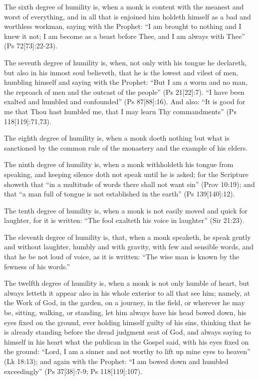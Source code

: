 The sixth degree of humility is, when a monk is content with the meanest and worst of everything, and in all that is enjoined him holdeth himself as a bad and worthless workman, saying with the Prophet: ``I am brought to nothing and I knew it not; I am become as a beast before Thee, and I am always with Thee'' (Ps 72[73]:22-23).

The seventh degree of humility is, when, not only with his tongue he declareth, but also in his inmost soul believeth, that he is the lowest and vilest of men, humbling himself and saying with the Prophet: ``But I am a worm and no man, the reproach of men and the outcast of the people'' (Ps 21[22]:7). ``I have been exalted and humbled and confounded'' (Ps 87[88]:16). And also: ``It is good for me that Thou hast humbled me, that I may learn Thy commandments'' (Ps 118[119]:71,73).

The eighth degree of humility is, when a monk doeth nothing but what is sanctioned by the common rule of the monastery and the example of his elders.

The ninth degree of humility is, when a monk withholdeth his tongue from speaking, and keeping silence doth not speak until he is asked; for the Scripture showeth that ``in a multitude of words there shall not want sin'' (Prov 10:19); and that ``a man full of tongue is not established in the earth'' (Ps 139[140]:12).

The tenth degree of humility is, when a monk is not easily moved and quick for laughter, for it is written: ``The fool exalteth his voice in laughter'' (Sir 21:23).

The eleventh degree of humility is, that, when a monk speaketh, he speak gently and without laughter, humbly and with gravity, with few and sensible words, and that he be not loud of voice, as it is written: ``The wise man is known by the fewness of his words.''

The twelfth degree of humility is, when a monk is not only humble of heart, but always letteth it appear also in his whole exterior to all that see him; namely, at the Work of God, in the garden, on a journey, in the field, or wherever he may be, sitting, walking, or standing, let him always have his head bowed down, his eyes fixed on the ground, ever holding himself guilty of his sins, thinking that he is already standing before the dread judgment seat of God, and always saying to himself in his heart what the publican in the Gospel said, with his eyes fixed on the ground: ``Lord, I am a sinner and not worthy to lift up mine eyes to heaven'' (Lk 18:13); and again with the Prophet: ``I am bowed down and humbled exceedingly'' (Ps 37[38]:7-9; Ps 118[119]:107).

